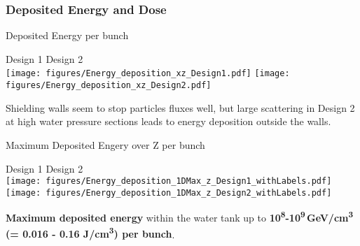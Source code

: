 \documentclass[xcolor={dvipsnames}]{beamer}
\begin{document}
\subsubsection{Deposited Energy and Dose}
\begin{frame}{Deposited Energy per bunch}
\begin{center}
\hspace*{1.6cm} Design 1 \hfill Design 2 \hspace*{1.8cm} \\
  \texttt{[image: figures/Energy\_deposition\_xz\_Design1.pdf]}
    \texttt{[image: figures/Energy\_deposition\_xz\_Design2.pdf]}
\end{center}
 Shielding walls seem to stop particles fluxes well, but large scattering in Design 2 at high water pressure sections leads to energy deposition outside the walls.
\end{frame}
\begin{frame}{Maximum Deposited Engery over Z per bunch}
\begin{center}
\hspace*{1.6cm} Design 1 \hfill Design 2 \hspace*{1.8cm} \\
  \texttt{[image: figures/Energy\_deposition\_1DMax\_z\_Design1\_withLabels.pdf]}
    \texttt{[image: figures/Energy\_deposition\_1DMax\_z\_Design2\_withLabels.pdf]}
\end{center}
  \textbf{Maximum deposited energy} within the water tank up to \textbf{10\textsuperscript{8}-10\textsuperscript{9}\,GeV/cm\textsuperscript{3} (= 0.016 - 0.16 J/cm\textsuperscript{3}) per bunch}.
\end{frame}
\end{document}
